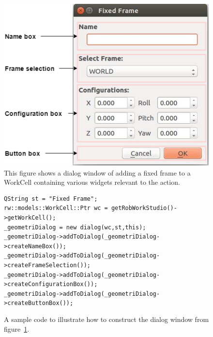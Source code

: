 \begin{figure}[h]
	\centering
	\includegraphics[scale=0.55]{Figures/dialogclassblocks.png}
	\caption{This figure shows a dialog window of adding a fixed frame to a WorkCell containing various widgets relevant to the action. }
	\label{fig:dialogclassblocks}
\end{figure}

\begin{figure}[h]
\centering
\lstset{language=C++} 
\begin{lstlisting}[frame=single]  
QString st = "Fixed Frame";
rw::models::WorkCell::Ptr wc = getRobWorkStudio()->getWorkCell();
_geometriDialog = new dialog(wc,st,this);
_geometriDialog->addToDialog(_geometriDialog->createNameBox());
_geometriDialog->addToDialog(_geometriDialog->createFrameSelection());
_geometriDialog->addToDialog(_geometriDialog->createConfigurationBox());
_geometriDialog->addToDialog(_geometriDialog->createButtonBox());		 
\end{lstlisting}
\caption{A sample code to illustrate how to construct the dialog window from figure~\ref{fig:dialogclassblocks}.}
\label{fig:dialogWindowCode} 	
\end{figure}







